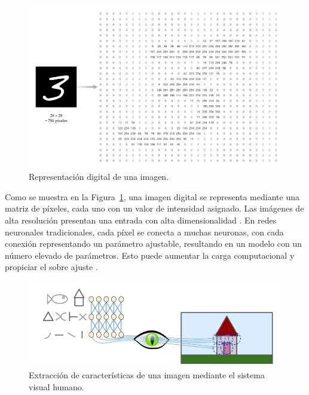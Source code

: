 \begin{figure}[H]
    \begin{center}
        \includegraphics[width=\textwidth]{Images/ComposicionImagen.pdf}
    \end{center}
    \caption{Representación digital de una imagen.}
    \label{fig:ComposicionImagen}
\end{figure}

Como se muestra en la Figura~\ref{fig:ComposicionImagen}, una imagen digital se representa mediante una matriz de píxeles, cada uno con un valor de intensidad asignado. Las imágenes de alta resolución presentan una entrada con alta dimensionalidad \cite{elgendy2020deep}. En redes neuronales tradicionales, cada píxel se conecta a muchas neuronas, con cada conexión representando un parámetro ajustable, resultando en un modelo con un número elevado de parámetros. Esto puede aumentar la carga computacional y propiciar el sobre ajuste \cite{rashid2016make}.

\begin{figure}[H]
    \begin{center}
        \includegraphics[width=\textwidth]{Images/VisionCNN.png}
    \end{center}
    \caption{Extracción de características de una imagen mediante el sistema visual humano.}
    \label{fig:VisionCNN}
\end{figure}


